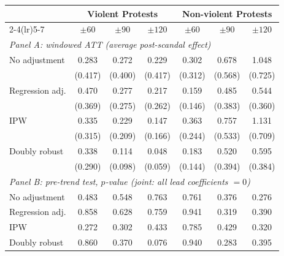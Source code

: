 {
\def\sym#1{\ifmmode^{#1}\else\(^{#1}\)\fi}
\begin{tabular}{l*{6}{c}}
\toprule
 & \multicolumn{3}{c}{Violent Protests} & \multicolumn{3}{c}{Non-violent Protests} \\
\cmidrule(lr){2-4}\cmidrule(lr){5-7}
 & \ensuremath{\pm 60} & \ensuremath{\pm 90} & \ensuremath{\pm 120} & \ensuremath{\pm 60} & \ensuremath{\pm 90} & \ensuremath{\pm 120} \\
\midrule
\multicolumn{7}{l}{\textit{Panel A: windowed ATT (average post-scandal effect)}}\\
No adjustment & 0.283 & 0.272 & 0.229 & 0.302 & 0.678 & 1.048 \\
             & (0.417) & (0.400) & (0.417) & (0.312) & (0.568) & (0.725) \\
Regression adj. & 0.470 & 0.277 & 0.217 & 0.159 & 0.485 & 0.544 \\
             & (0.369) & (0.275) & (0.262) & (0.146) & (0.383) & (0.360) \\
IPW & 0.335 & 0.229 & 0.147 & 0.363 & 0.757 & 1.131 \\
             & (0.315) & (0.209) & (0.166) & (0.244) & (0.533) & (0.709) \\
Doubly robust & 0.338 & 0.114 & 0.048 & 0.183 & 0.520 & 0.595 \\
             & (0.290) & (0.098) & (0.059) & (0.144) & (0.394) & (0.384) \\
\midrule
\multicolumn{7}{l}{\textit{Panel B: pre-trend test, \(p\)-value (joint: all lead coefficients \(=0\))}}\\
No adjustment & 0.483 & 0.548 & 0.763 & 0.761 & 0.376 & 0.276 \\
Regression adj. & 0.858 & 0.628 & 0.759 & 0.941 & 0.319 & 0.390 \\
IPW & 0.272 & 0.302 & 0.433 & 0.785 & 0.429 & 0.320 \\
Doubly robust & 0.860 & 0.370 & 0.076 & 0.940 & 0.283 & 0.395 \\
\bottomrule
\end{tabular}
}
